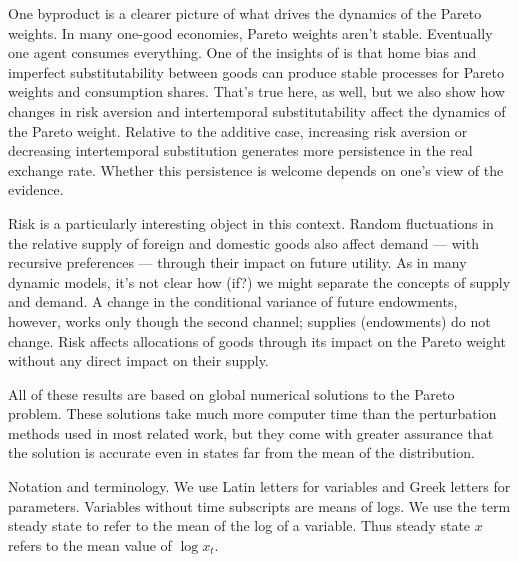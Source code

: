 One byproduct is a clearer picture of what drives the dynamics
of the Pareto weights.
In many one-good economies, Pareto weights aren't stable.
Eventually one agent consumes everything.
One of the insights of \citet{Colacito2013-yq}
is that home bias and imperfect substitutability between goods
can produce stable processes for Pareto weights and consumption shares.
That's true here, as well, but we also show how changes in risk aversion
and intertemporal substitutability affect
the dynamics of the Pareto weight.
Relative to the additive case, increasing risk aversion
or decreasing intertemporal substitution
generates more persistence in the real exchange rate.
Whether this persistence is welcome depends on one's view
of the evidence.

Risk is a particularly interesting object in this context.
Random fluctuations in the relative supply of foreign and domestic goods
also affect demand --- with recursive preferences --- through their impact on future utility.
As in many dynamic models, it's not clear how (if?)
we might separate the concepts of supply and demand.
A change in the conditional variance of future endowments, however, works only though the second channel;
supplies (endowments) do not change.
Risk affects allocations of goods through its impact on the Pareto weight
without any direct impact on their supply.

All of these results are based on global numerical solutions to the Pareto problem.
These solutions take much more computer time than the perturbation methods used in most
related work,
but they come with greater assurance that the solution is accurate even
in states far from the mean of the distribution.

Notation and terminology.  We use Latin letters for variables and Greek letters for parameters.
Variables without time subscripts are means of logs.
We use the term steady state to refer to the mean of the log of a variable.
Thus steady state $x$ refers to the mean value of $\log x_t$.
